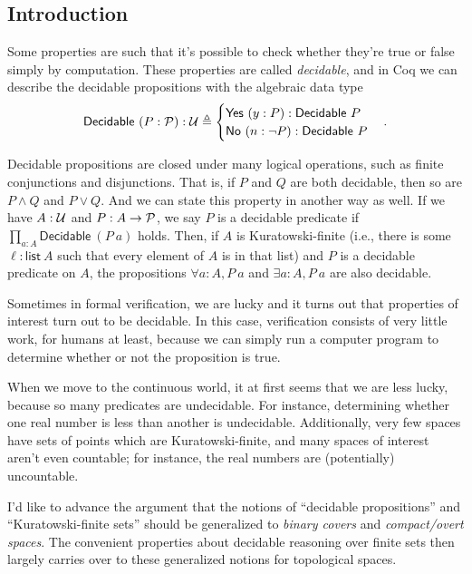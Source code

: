 \subsection{Introduction}

Some properties are such that it's possible to check whether they're true or false simply by computation. These properties are called \emph{decidable}, and in Coq we can describe the decidable propositions with the algebraic data type
\[
\mathsf{Decidable}\ (P : \mathcal{P}) : \mathcal{U} \triangleq
  \begin{cases}
  \mathsf{Yes}\ (y : P) : \mathsf{Decidable}\ P
  \\ \mathsf{No}\ (n : \neg P) : \mathsf{Decidable}\ P
  \end{cases}.
\]

Decidable propositions are closed under many logical operations, such as finite conjunctions and disjunctions. That is, if $P$ and $Q$ are both decidable, then so are $P \wedge Q$ and $P \vee Q$. And we can state this property in another way as well. If we have $A : \mathcal{U}$ and $P : A \to \mathcal{P}$, we say $P$ is a decidable predicate if $\prod_{a : A} \mathsf{Decidable}\ (P\ a)$ holds. Then, if $A$ is Kuratowski-finite (i.e., there is some $\ell : \mathsf{list}\ A$ such that every element of $A$ is in that list) and $P$ is a decidable predicate on $A$, the propositions $\forall a : A, P\ a$ and $\exists a : A, P\ a$ are also decidable.

Sometimes in formal verification, we are lucky and it turns out that properties of interest turn out to be decidable. In this case, verification consists of very little work, for humans at least, because we can simply run a computer program to determine whether or not the proposition is true.

When we move to the continuous world, it at first seems that we are less lucky, because so many predicates are undecidable. For instance, determining whether one real number is less than another is undecidable. Additionally, very few spaces have sets of points which are Kuratowski-finite, and many spaces of interest aren't even countable; for instance, the real numbers are (potentially) uncountable.

I'd like to advance the argument that the notions of ``decidable propositions'' and ``Kuratowski-finite sets'' should be generalized to \emph{binary covers} and \emph{compact/overt spaces}. The convenient properties about decidable reasoning over finite sets then largely carries over to these generalized notions for topological spaces.

